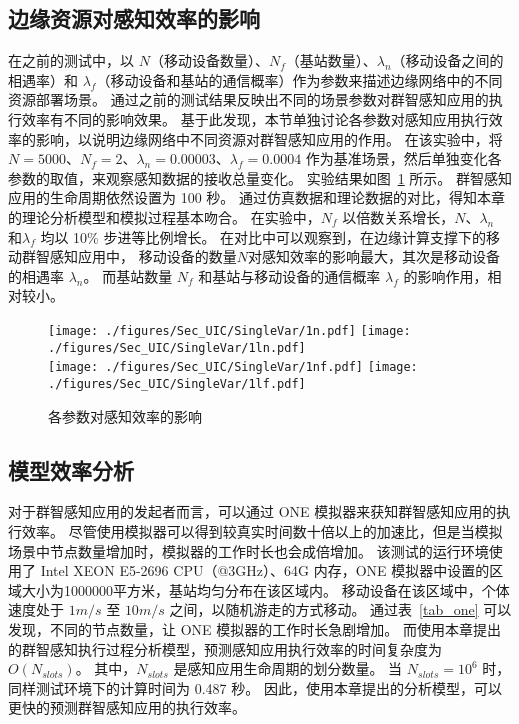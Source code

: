 \subsection{边缘资源对感知效率的影响}

在之前的测试中，以 $N$（移动设备数量）、$N_f$（基站数量）、$\lambda_n$（移动设备之间的相遇率）和 $\lambda_f$（移动设备和基站的通信概率）作为参数来描述边缘网络中的不同资源部署场景。
通过之前的测试结果反映出不同的场景参数对群智感知应用的执行效率有不同的影响效果。
基于此发现，本节单独讨论各参数对感知应用执行效率的影响，以说明边缘网络中不同资源对群智感知应用的作用。
在该实验中，将 $N=5000$、$N_f=2$、$\lambda_n = 0.00003$、$\lambda_f=0.0004$ 作为基准场景，然后单独变化各参数的取值，来观察感知数据的接收总量变化。
实验结果如图~\ref{Figure_SingleValTest} 所示。
群智感知应用的生命周期依然设置为 100 秒。
通过仿真数据和理论数据的对比，得知本章的理论分析模型和模拟过程基本吻合。
在实验中，$N_f$ 以倍数关系增长，$N$、$\lambda_n$ 和$\lambda_f$ 均以 10\% 步进等比例增长。
在对比中可以观察到，在边缘计算支撑下的移动群智感知应用中，
移动设备的数量$N$对感知效率的影响最大，其次是移动设备的相遇率 $\lambda_n$。
而基站数量 $N_f$ 和基站与移动设备的通信概率 $\lambda_f$ 的影响作用，相对较小。

\begin{figure}[!h]
  \centering
	{\texttt{[image: ./figures/Sec\_UIC/SingleVar/1n.pdf]}}
	{\texttt{[image: ./figures/Sec\_UIC/SingleVar/1ln.pdf]}}\\
	{\texttt{[image: ./figures/Sec\_UIC/SingleVar/1nf.pdf]}}
	{\texttt{[image: ./figures/Sec\_UIC/SingleVar/1lf.pdf]}}
	\vspace{-1em}
	\caption{各参数对感知效率的影响}
	\vspace{-1.5em}
	\label{Figure_SingleValTest}
\end{figure}

\subsection{模型效率分析}

对于群智感知应用的发起者而言，可以通过 ONE 模拟器来获知群智感知应用的执行效率。
尽管使用模拟器可以得到较真实时间数十倍以上的加速比，但是当模拟场景中节点数量增加时，模拟器的工作时长也会成倍增加。
该测试的运行环境使用了 Intel XEON E5-2696 CPU（@3GHz）、64G 内存，ONE 模拟器中设置的区域大小为1000000平方米，基站均匀分布在该区域内。
移动设备在该区域中，个体速度处于 $1m/s$ 至 $10m/s$ 之间，以随机游走的方式移动。
通过表~\ref{tab_one} 可以发现，不同的节点数量，让 ONE 模拟器的工作时长急剧增加。
而使用本章提出的群智感知执行过程分析模型，预测感知应用执行效率的时间复杂度为 $O(N_{slots})$。
其中，$N_{slots}$ 是感知应用生命周期的划分数量。
当 $N_{slots} = 10^6$ 时，同样测试环境下的计算时间为 0.487 秒。
因此，使用本章提出的分析模型，可以更快的预测群智感知应用的执行效率。

